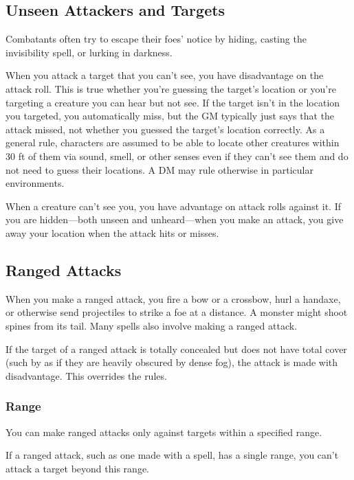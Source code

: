 \subsection{Unseen Attackers and Targets}\label{subsec:unseen-attackers}

Combatants often try to escape their foes' notice by hiding, casting the invisibility spell, or lurking in darkness.

When you attack a target that you can't see, you have disadvantage on the attack roll. This is true whether you're guessing the target's location or you're targeting a creature you can hear but not see. If the target isn't in the location you targeted, you automatically miss, but the GM typically just says that the attack missed, not whether you guessed the target's location correctly. As a general rule, characters are assumed to be able to locate other creatures within 30 ft of them via sound, smell, or other senses even if they can't see them and do not need to guess their locations. A DM may rule otherwise in particular environments.

When a creature can't see you, you have advantage on attack rolls against it. If you are hidden—both unseen and unheard—when you make an attack, you give away your location when the attack hits or misses.

\subsection{Ranged Attacks}

When you make a ranged attack, you fire a bow or a crossbow, hurl a handaxe, or otherwise send projectiles to strike a foe at a distance. A monster might shoot spines from its tail. Many spells also involve making a ranged attack.

If the target of a ranged attack is totally concealed but does not have total cover (such by as if they are heavily obscured by dense fog), the attack is made with disadvantage. This overrides the  rules.

\subsubsection{Range}

You can make ranged attacks only against targets within a specified range.

If a ranged attack, such as one made with a spell, has a single range, you can't attack a target beyond this range.

